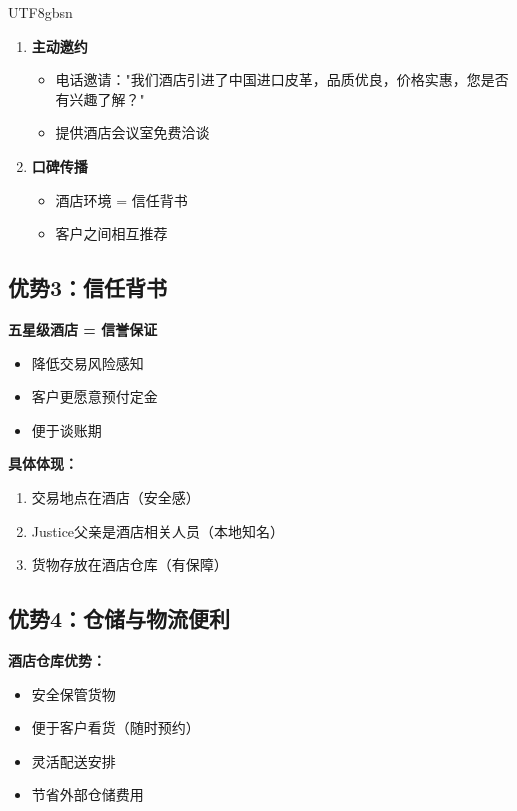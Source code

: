 \documentclass[12pt,a4paper]{article}
\begin{document}
\begin{CJK}{UTF8}{gbsn}
\begin{enumerate}
    \item \textbf{主动邀约}
    \begin{itemize}
        \item 电话邀请："我们酒店引进了中国进口皮革，品质优良，价格实惠，您是否有兴趣了解？"
        \item 提供酒店会议室免费洽谈
    \end{itemize}
    
    \item \textbf{口碑传播}
    \begin{itemize}
        \item 酒店环境 = 信任背书
        \item 客户之间相互推荐
    \end{itemize}
\end{enumerate}

\subsection{优势3：信任背书}

\textbf{五星级酒店 = 信誉保证}

\begin{itemize}
    \item 降低交易风险感知
    \item 客户更愿意预付定金
    \item 便于谈账期
\end{itemize}

\textbf{具体体现：}
\begin{enumerate}
    \item 交易地点在酒店（安全感）
    \item Justice父亲是酒店相关人员（本地知名）
    \item 货物存放在酒店仓库（有保障）
\end{enumerate}

\subsection{优势4：仓储与物流便利}

\textbf{酒店仓库优势：}
\begin{itemize}
    \item 安全保管货物
    \item 便于客户看货（随时预约）
    \item 灵活配送安排
    \item 节省外部仓储费用
\end{itemize}


\end{CJK}
\end{document}
